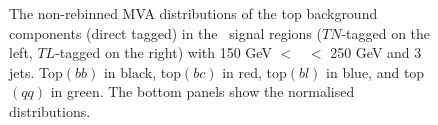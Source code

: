 \begin{figure}[!htbp]
    \centering
      \caption{The non-rebinned MVA distributions of the top background components (direct tagged) in the \vhc\ signal regions ($TN$-tagged on the left, $TL$-tagged on the right) with 150 GeV $<$ \ptv\ $<$ 250 GeV and 3 jets. Top$(bb)$ in black, top$(bc)$ in red, top$(bl)$ in blue, and top$(qq)$ in green. The bottom panels show the normalised distributions.} 
      \label{fig:topflavdistr_VHcc}
\end{figure}


